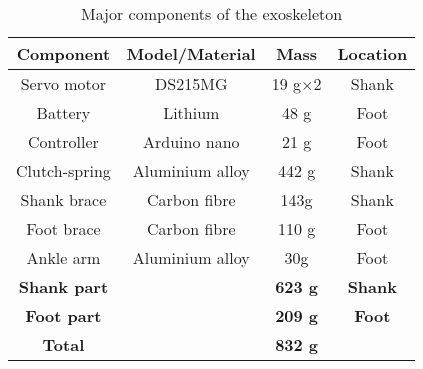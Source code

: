 \documentclass[10pt]{asme2ej}
\begin{document}
%




\clearpage

\begin{table}[t]
	\caption{Major components of the exoskeleton}
	\begin{center}
		\label{tab:hardware}
		\begin{tabular}{c c c c}	
			\hline
			\textbf{Component} & \textbf{Model/Material} & \textbf{Mass} & \textbf{Location} \\
			\hline
			Servo motor & DS215MG & 19 g$\times$2 & Shank\\
			Battery & Lithium & 48 g & Foot\\
			Controller & Arduino nano & 21 g & Foot\\
			Clutch-spring & Aluminium alloy & 442 g & Shank\\
			Shank brace & Carbon fibre & 143g & Shank\\
			Foot brace & Carbon fibre & 110 g & Foot\\
			Ankle arm & Aluminium alloy & 30g & Foot\\			
			\hline 
			\textbf{Shank part} & & \textbf{623 g} & \textbf{Shank}\\
			\textbf{Foot part} & & \textbf{209 g} & \textbf{Foot}\\
			\hline
			\textbf{Total} & & \textbf{832 g} & \\
			\hline
		\end{tabular}
	\end{center}
\end{table}

\clearpage
\end{document}
